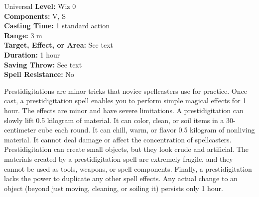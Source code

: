 {Universal}
{
	\textbf{Level:}
	Wiz 0\\
	\textbf{Components:}
	V, S\\
	\textbf{Casting Time:}
	1 standard action\\
	\textbf{Range:}
	3 m\\
	\textbf{Target, Effect, or Area:}
	See text\\
	\textbf{Duration:}
	1 hour\\
	\textbf{Saving Throw:}
	See text\\
	\textbf{Spell Resistance:}
	No\\
}
{
	Prestidigitations are minor tricks that novice spellcasters use for practice. Once cast, a prestidigitation spell enables you to perform simple magical effects for 1 hour. The effects are minor and have severe limitations. A prestidigitation can slowly lift 0.5 kilogram of material. It can color, clean, or soil items in a 30-centimeter cube each round. It can chill, warm, or flavor 0.5 kilogram of nonliving material. It cannot deal damage or affect the concentration of spellcasters. Prestidigitation can create small objects, but they look crude and artificial. The materials created by a prestidigitation spell are extremely fragile, and they cannot be used as tools, weapons, or spell components. Finally, a prestidigitation lacks the power to duplicate any other spell effects. Any actual change to an object (beyond just moving, cleaning, or soiling it) persists only 1 hour.

}

